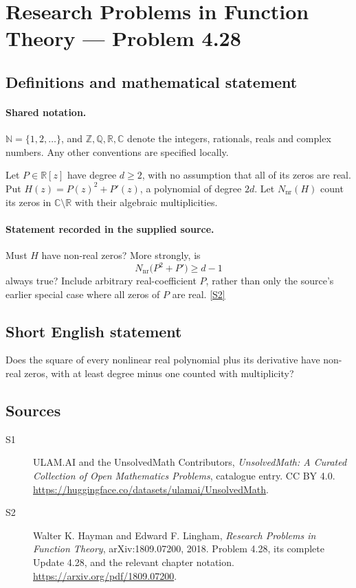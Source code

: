 \documentclass[11pt]{book}
\newcommand{\sref}[2]{\hyperlink{source:#1:#2}{[S#2]}}
\begin{document}
\section{Research Problems in Function Theory — Problem 4.28}\label{statement}

\subsection{Definitions and mathematical statement}

\paragraph{Shared notation.}$\mathbb N=\{1,2,\ldots\}$, and $\mathbb Z,\mathbb Q,\mathbb R,\mathbb C$ denote the integers, rationals, reals and complex numbers. Any other conventions are specified locally.


Let $P\in\mathbb R[z]$ have degree $d\ge2$, with no assumption that all of its zeros are real. Put $H(z)=P(z)^2+P'(z)$, a polynomial of degree $2d$. Let $N_{\mathrm{nr}}(H)$ count its zeros in $\mathbb C\setminus\mathbb R$ with their algebraic multiplicities.
\paragraph{Statement recorded in the supplied source.}
Must $H$ have non-real zeros? More strongly, is
\[N_{\mathrm{nr}}\bigl(P^2+P'\bigr)\ge d-1\]
always true? Include arbitrary real-coefficient $P$, rather than only the source's earlier special case where all zeros of $P$ are real. \sref{statement}{2}
\subsection{Short English statement}
Does the square of every nonlinear real polynomial plus its derivative have non-real zeros, with at least degree minus one counted with multiplicity?
\subsection{Sources}
\begin{description}
\item[\hypertarget{source:statement:1}{S1}] ULAM.AI and the UnsolvedMath Contributors, \emph{UnsolvedMath: A Curated Collection of Open Mathematics Problems}, catalogue entry. CC BY 4.0. \url{https://huggingface.co/datasets/ulamai/UnsolvedMath}.
\item[\hypertarget{source:statement:2}{S2}] Walter K. Hayman and Edward F. Lingham, \emph{Research Problems in Function Theory}, arXiv:1809.07200, 2018. Problem 4.28, its complete Update 4.28, and the relevant chapter notation. \url{https://arxiv.org/pdf/1809.07200}.
\end{description}
\label{end:statement}
\end{document}
